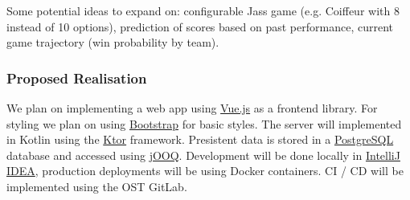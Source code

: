 Some potential ideas to expand on: configurable Jass game (e.g. Coiffeur with 8 instead of 10 options), prediction of scores based on past performance, current game trajectory (win probability by team).

\subsubsection*{Proposed Realisation}

We plan on implementing a web app using \href{https://vuejs.org/}{Vue.js} as a frontend library. For styling we plan on using \href{https://getbootstrap.com/}{Bootstrap} for basic styles.
The server will implemented in Kotlin using the \href{https://ktor.io/}{Ktor} framework.
Presistent data is stored in a \href{https://www.postgresql.org/}{PostgreSQL} database and accessed using \href{https://www.jooq.org/}{jOOQ}.
Development will be done locally in \href{https://www.jetbrains.com/idea/}{IntelliJ IDEA}, production deployments will be using Docker containers.
CI / CD will be implemented using the OST GitLab.
